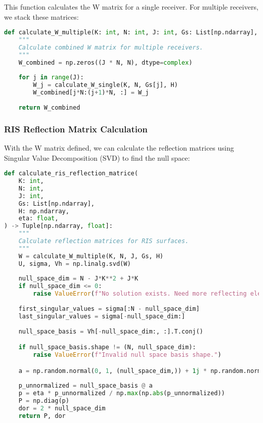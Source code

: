 \newpage
This function calculates the W matrix for a single receiver. For multiple receivers, we stack these matrices:

\begin{lstlisting}[language=python, caption={W matrix for multiple receivers}]
def calculate_W_multiple(K: int, N: int, J: int, Gs: List[np.ndarray], H: np.ndarray) -> np.ndarray:
    """
    Calculate combined W matrix for multiple receivers.
    """
    W_combined = np.zeros((J * N, N), dtype=complex)
    
    for j in range(J):
        W_j = calculate_W_single(K, N, Gs[j], H)
        W_combined[j*N:(j+1)*N, :] = W_j
    
    return W_combined
\end{lstlisting}

\subsubsection{RIS Reflection Matrix Calculation}

With the W matrix defined, we can calculate the reflection matrices using Singular Value Decomposition (SVD) to find the null space:

\begin{lstlisting}[language=python, caption={RIS Reflection Matrix Calculation}]
def calculate_ris_reflection_matrice(
    K: int, 
    N: int, 
    J: int, 
    Gs: List[np.ndarray], 
    H: np.ndarray, 
    eta: float,
) -> Tuple[np.ndarray, float]:
    """
    Calculate reflection matrices for RIS surfaces.
    """
    W = calculate_W_multiple(K, N, J, Gs, H)
    U, sigma, Vh = np.linalg.svd(W)
    
    null_space_dim = N - J*K**2 + J*K
    if null_space_dim <= 0:
        raise ValueError(f"No solution exists. Need more reflecting elements.")
    
    first_singular_values = sigma[:N - null_space_dim]
    last_singular_values = sigma[-null_space_dim:]
    
    null_space_basis = Vh[-null_space_dim:, :].T.conj()

    if null_space_basis.shape != (N, null_space_dim):
        raise ValueError(f"Invalid null space basis shape.")

    a = np.random.normal(0, 1, (null_space_dim,)) + 1j * np.random.normal(0, 1, (null_space_dim,))
    
    p_unnormalized = null_space_basis @ a
    p = eta * p_unnormalized / np.max(np.abs(p_unnormalized))
    P = np.diag(p)
    dor = 2 * null_space_dim
    return P, dor
\end{lstlisting}

